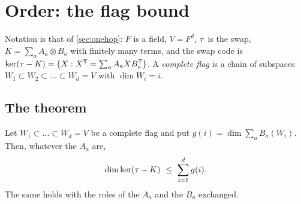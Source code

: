 \section{Order: the flag bound}\label{sec:order}

Notation is that of \cref{sec:onehop}: $F$ is a field, $V=F^d$, $\tau$ is the swap, $K=\sum_aA_a\otimes B_a$ with finitely
many terms, and the swap code is $\ker(\tau-K)=\{X:X^{\mathsf{T}}=\sum_aA_aXB_a^{\mathsf{T}}\}$. A \emph{complete flag} is a chain of
subspaces $W_1\subset W_2\subset\dots\subset W_d=V$ with $\dim W_i=i$.

\subsection{The theorem}

\begin{theorem}\label{thm:FL}
Let $W_1\subset\dots\subset W_d=V$ be a complete flag and put $g(i)=\dim\sum_aB_a(W_i)$. Then, whatever the $A_a$ are,
\[
  \dim\ker(\sw-K)\ \le\ \sum_{i=1}^{d}g(i).
\]
The same holds with the roles of the $A_a$ and the $B_a$ exchanged.
\end{theorem}

